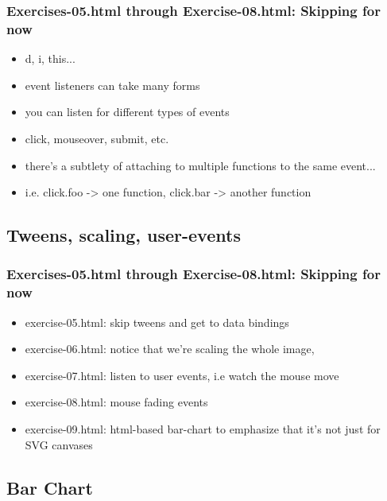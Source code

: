 \documentclass{beamer}
\begin{document}
\begin{frame}
\begin{frame}
    \frametitle{Exercises-05.html through Exercise-08.html: Skipping for now}
        \begin{itemize}
        \item d, i, this...
        \item event listeners can take many forms
        \item you can listen for different types of events
        \item click, mouseover, submit, etc.
        \item there's a subtlety of attaching to multiple functions to the same event...
        \item i.e. click.foo -> one function, click.bar -> another function
        \end{itemize}
\end{frame}



\subsection{Tweens, scaling, user-events}

\begin{frame}
    \frametitle{Exercises-05.html through Exercise-08.html: Skipping for now}
        \begin{itemize}
        \item exercise-05.html: skip tweens and get to data bindings
        \item exercise-06.html: notice that we're scaling the whole image,
        \item exercise-07.html: listen to user events, i.e watch the mouse move
        \item exercise-08.html: mouse fading events
        \item exercise-09.html: html-based bar-chart to emphasize that it's not just for SVG canvases
        \end{itemize}
\end{frame}



\subsection{Bar Chart}


\end{frame}
\end{document}
